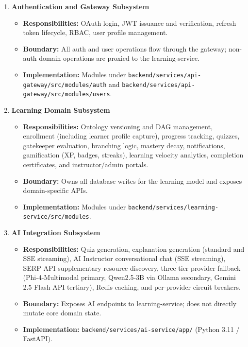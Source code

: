 \begin{enumerate}
    \item \textbf{Authentication and Gateway Subsystem}
        \begin{itemize}
            \item \textbf{Responsibilities:} OAuth login, JWT issuance and verification, refresh token lifecycle, RBAC, user profile management.
            \item \textbf{Boundary:} All auth and user operations flow through the gateway; non-auth domain operations are proxied to the learning-service.
            \item \textbf{Implementation:} Modules under \texttt{backend/services/api-gateway/src/modules/auth} and \texttt{backend/services/api-gateway/src/modules/users}.
        \end{itemize}
    \item \textbf{Learning Domain Subsystem}
        \begin{itemize}
            \item \textbf{Responsibilities:} Ontology versioning and DAG management, enrollment (including learner profile capture), progress tracking, quizzes, gatekeeper evaluation, branching logic, mastery decay, notifications, gamification (XP, badges, streaks), learning velocity analytics, completion certificates, and instructor/admin portals.
            \item \textbf{Boundary:} Owns all database writes for the learning model and exposes domain-specific APIs.
            \item \textbf{Implementation:} Modules under \texttt{backend/services/learning-service/src/modules}.
        \end{itemize}
    \item \textbf{AI Integration Subsystem}
        \begin{itemize}
            \item \textbf{Responsibilities:} Quiz generation, explanation generation (standard and SSE streaming), AI Instructor conversational chat (SSE streaming), SERP API supplementary resource discovery, three-tier provider fallback (Phi-4-Multimodal primary, Qwen2.5-3B via Ollama secondary, Gemini 2.5 Flash API tertiary), Redis caching, and per-provider circuit breakers.
            \item \textbf{Boundary:} Exposes AI endpoints to learning-service; does not directly mutate core domain state.
            \item \textbf{Implementation:} \texttt{backend/services/ai-service/app/} (Python 3.11 / FastAPI).

\end{itemize}
\end{enumerate}

